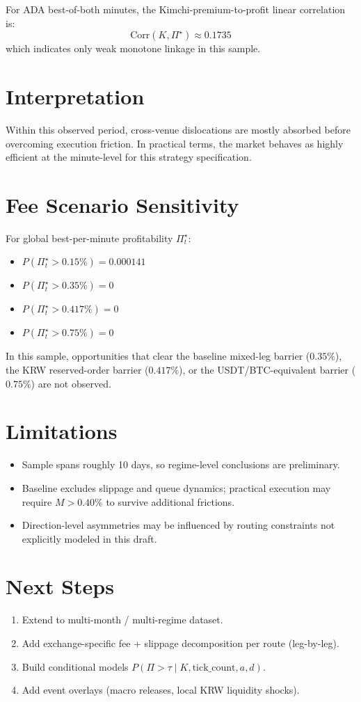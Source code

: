 \documentclass[11pt,a4paper]{article}
\begin{document}
For ADA best-of-both minutes, the Kimchi-premium-to-profit linear correlation is:
\begin{equation}
\mathrm{Corr}(K, \Pi^\star) \approx 0.1735
\end{equation}
which indicates only weak monotone linkage in this sample.

\section{Interpretation}
Within this observed period, cross-venue dislocations are mostly absorbed before overcoming execution friction. In practical terms, the market behaves as highly efficient at the minute-level for this strategy specification.

\section{Fee Scenario Sensitivity}
For global best-per-minute profitability $\Pi_t^\star$:
\begin{itemize}
    \item $P(\Pi_t^\star > 0.15\%) = 0.000141$
    \item $P(\Pi_t^\star > 0.35\%) = 0$
    \item $P(\Pi_t^\star > 0.417\%) = 0$
    \item $P(\Pi_t^\star > 0.75\%) = 0$
\end{itemize}
In this sample, opportunities that clear the baseline mixed-leg barrier ($0.35\%$), the KRW reserved-order barrier ($0.417\%$), or the USDT/BTC-equivalent barrier ($0.75\%$) are not observed.

\section{Limitations}
\begin{itemize}
    \item Sample spans roughly 10 days, so regime-level conclusions are preliminary.
    \item Baseline excludes slippage and queue dynamics; practical execution may require $M > 0.40\%$ to survive additional frictions.
    \item Direction-level asymmetries may be influenced by routing constraints not explicitly modeled in this draft.
\end{itemize}

\section{Next Steps}
\begin{enumerate}
    \item Extend to multi-month / multi-regime dataset.
    \item Add exchange-specific fee + slippage decomposition per route (leg-by-leg).
    \item Build conditional models $P(\Pi>\tau \mid K, \text{tick\_count}, a, d)$.
    \item Add event overlays (macro releases, local KRW liquidity shocks).
\end{enumerate}
\end{document}
